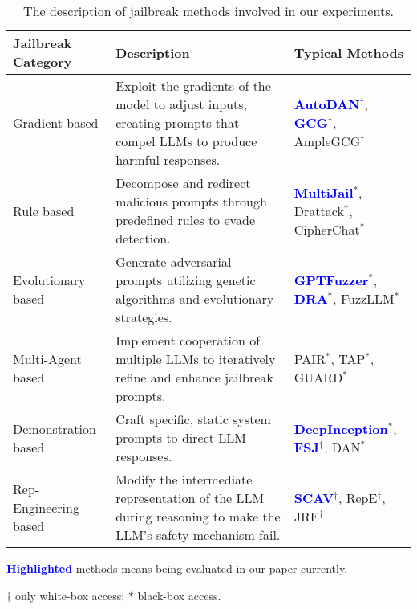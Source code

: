 \begin{table*}[hp]
\centering
\caption{The description of jailbreak methods involved in our experiments.}
\label{tab:jailbreak_methods}
\begin{threeparttable}
\footnotesize
\renewcommand{\arraystretch}{1.2}
\setlength{\tabcolsep}{0.9\tabcolsep}
\setlength{\defaultaddspace}{0.7\defaultaddspace} %
\centering
\begin{tabular}{>{\raggedright}m{3.5cm}m{5cm}p{4.5cm}}
\toprule
\textbf{Jailbreak Category} & \textbf{Description} & \textbf{Typical Methods} \\
\toprule
Gradient based & Exploit the gradients of the model to adjust inputs, creating prompts that compel LLMs to produce harmful responses. & \textcolor{blue}{\textbf{AutoDAN}}$^\dag$, \textcolor{blue}{\textbf{GCG}}$^\dag$, AmpleGCG$^\dag$ \\
\midrule
Rule based & Decompose and redirect malicious prompts through predefined rules to evade detection. & \textcolor{blue}{\textbf{MultiJail}}$^*$, Drattack$^*$, CipherChat$^*$ \\
\midrule
Evolutionary based & Generate adversarial prompts utilizing genetic algorithms and evolutionary strategies. & \textcolor{blue}{\textbf{GPTFuzzer}}$^*$, \textcolor{blue}{\textbf{DRA}}$^*$, FuzzLLM$^*$ \\
\midrule
Multi-Agent based & Implement cooperation of multiple LLMs to iteratively refine and enhance jailbreak prompts. & PAIR$^*$, TAP$^*$, GUARD$^*$ \\
\midrule
Demonstration based & Craft specific, static system prompts to direct LLM responses. & \textcolor{blue}{\textbf{DeepInception}}$^*$, \textcolor{blue}{\textbf{FSJ}}$^\dag$, DAN$^*$ \\
\midrule
Rep-Engineering based & Modify the intermediate representation of the LLM during reasoning to make the LLM's safety mechanism fail. & \textcolor{blue}{\textbf{SCAV}}$^\dag$, RepE$^\dag$, JRE$^\dag$ \\
\bottomrule
\end{tabular}
\begin{tablenotes}
\item \textbf{\textcolor{blue}{Highlighted}} methods means being evaluated in our paper currently.
\item $\dag$ only white-box access; $*$ black-box access.
\end{tablenotes}
\end{threeparttable}%
\end{table*}